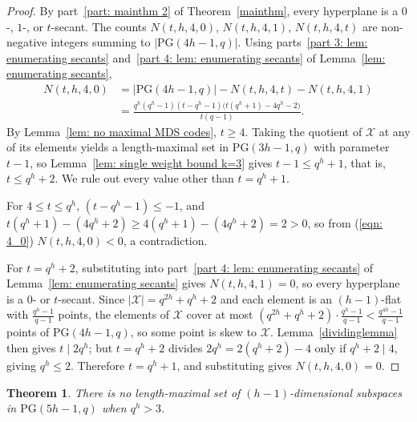 \documentclass[12pt, twoside]{article}
\newtheorem{theorem}{\bf Theorem}%
\begin{document}
	\begin{proof}
		By part~\ref{part: mainthm 2} of Theorem~\ref{mainthm}, every hyperplane is a $0$-, $1$-, or $t$-secant. The counts $N(t,h,4,0)$, $N(t,h,4,1)$, $N(t,h,4,t)$ are non-negative integers summing to $|\mathrm{PG}(4h-1,q)|$. Using parts~\ref{part 3: lem: enumerating secants} and~\ref{part 4: lem: enumerating secants} of Lemma~\ref{lem: enumerating secants},
		\begin{align}
		N(t,h,4,0) & = |\mathrm{PG}(4h-1,q)| - N(t,h,4,t) - N(t,h,4,1) \nonumber \\ 
		& = \frac{q^h(q^h-1)(t-q^h-1)\bigl(t(q^h+1)-4q^h-2\bigr)}{t(q-1)}. \label{eqn: 4_0}
		\end{align}	
		By Lemma~\ref{lem: no maximal MDS codes}, $t \ge 4$. Taking the quotient of $\mathcal{X}$ at any of its elements yields a length-maximal set in $\mathrm{PG}(3h-1,q)$ with parameter $t-1$, so Lemma~\ref{lem: single weight bound k=3} gives $t-1 \le q^h+1$, that is, $t \le q^h+2$. We rule out every value other than $t=q^h+1$.
		
		For $4 \le t \le q^h$,  $(t-q^h-1) \le -1 $, and $t(q^h+1)-(4q^h+2) \ge 4(q^h+1)-(4q^h+2) = 2 > 0$, so from (\ref{eqn: 4_0}) $N(t,h,4,0) < 0$, a contradiction.

		For $t = q^h+2$, substituting into part~\ref{part 4: lem: enumerating secants} of Lemma~\ref{lem: enumerating secants} gives $N(t,h,4,1)=0$, so every hyperplane is a $0$- or $t$-secant. Since $|\mathcal{X}| = q^{2h}+q^h+2$ and each element is an $(h-1)$-flat with $\frac{q^h-1}{q-1}$ points, the elements of $\mathcal{X}$ cover at most $
		(q^{2h}+q^h+2)\cdot\frac{q^h-1}{q-1} < \frac{q^{4h}-1}{q-1}
		$
		points of $\mathrm{PG}(4h-1,q)$, so some point is skew to $\mathcal{X}$. Lemma~\ref{dividinglemma} then gives $t \mid 2q^h$; but $t=q^h+2$ divides $2q^h = 2(q^h+2)-4$ only if $q^h+2 \mid 4$, giving $q^h \le 2$. 
		Therefore $t=q^h+1$, and substituting gives $N(t,h,4,0)=0$.
	\end{proof}
	
	\begin{theorem}\label{lem: k=5 maximal arc DNE}
		There is no length-maximal set of $(h-1)$-dimensional subspaces in $\mathrm{PG}(5h-1, q)$ when $q^h > 3$.
	\end{theorem}
	
\end{document}
